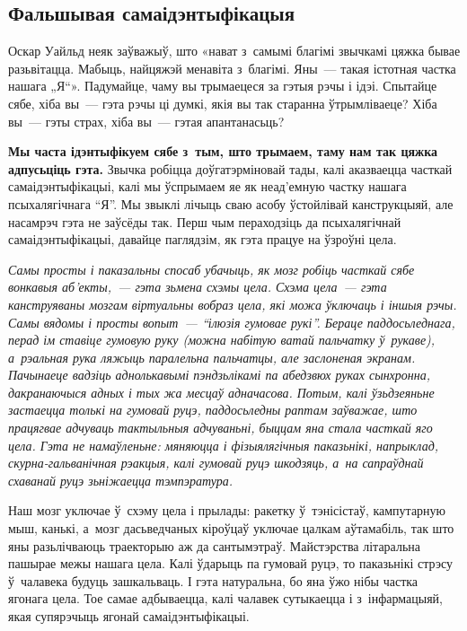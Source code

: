 \subsection*{Фальшывая самаідэнтыфікацыя}

Оскар Уайльд неяк заўважыў, што «нават з~самымі благімі звычкамі цяжка бывае разьвітацца. Мабыць, найцяжэй менавіта з~благімі. Яны~--- такая істотная частка нашага „Я“». Падумайце, чаму вы трымаецеся за гэтыя рэчы і ідэі. Спытайце сябе, хіба вы~--- гэта рэчы ці думкі, якія вы так старанна ўтрымліваеце? Хіба вы~--- гэты страх, хіба вы~--- гэтая апантанасьць?

\textbf{Мы часта ідэнтыфікуем сябе з~тым, што трымаем, таму нам так цяжка адпусьціць гэта.} Звычка робіцца доўгатэрміновай тады, калі аказваецца часткай самаідэнтыфікацыі, калі мы ўспрымаем яе як неад'емную частку нашага псыхалягічнага ``Я''. Мы звыклі лічыць сваю асобу ўстойлівай канструкцыяй, але насамрэч гэта не заўсёды так. Перш чым пераходзіць да псыхалягічнай самаідэнтыфікацыі, давайце паглядзім, як гэта працуе на ўзроўні цела.

\emph{Самы просты і паказальны спосаб убачыць, як мозг робіць часткай сябе вонкавыя аб'екты,~--- гэта зьмена схэмы цела. Схэма цела~--- гэта канструяваны мозгам віртуальны вобраз цела, які можа ўключаць і іншыя рэчы. Самы вядомы і просты вопыт~--- ``ілюзія гумовае рукі''. Бераце паддосьледнага, перад ім ставіце гумовую руку (можна набітую ватай пальчатку ў~рукаве), а~рэальная рука ляжыць паралельна пальчатцы, але заслоненая экранам. Пачынаеце вадзіць аднолькавымі пэндзьлікамі па абедзвюх руках сынхронна, дакранаючыся адных і тых жа месцаў адначасова. Потым, калі ўзьдзеяньне застаецца толькі на гумовай руцэ, паддосьледны раптам заўважае, што працягвае адчуваць тактыльныя адчуваньні, быццам яна стала часткай яго цела. Гэта не намаўленьне: мяняюцца і фізыялягічныя паказьнікі, напрыклад, скурна-гальванічная рэакцыя, калі гумовай руцэ шкодзяць, а~на сапраўднай схаванай руцэ зьніжаецца тэмпэратура.}

Наш мозг уключае ў~схэму цела і прылады: ракетку ў~тэнісістаў, кампутарную мыш, канькі, а~мозг дасьведчаных кіроўцаў уключае цалкам аўтамабіль, так што яны разьлічваюць траекторыю аж да сантымэтраў. Майстэрства літаральна пашырае межы нашага цела. Калі ўдарыць па гумовай руцэ, то паказьнікі стрэсу ў~чалавека будуць зашкальваць. І гэта натуральна, бо яна ўжо нібы частка ягонага цела. Тое самае адбываецца, калі чалавек сутыкаецца і з~інфармацыяй, якая супярэчыць ягонай самаідэнтыфікацыі.

